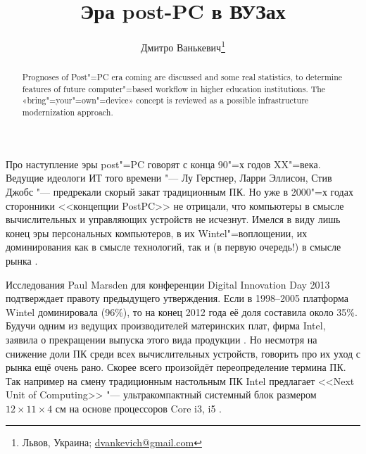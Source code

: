 \documentclass[10pt, a5paper]{article}
\begin{document}
\title{Эра post-PC в ВУЗах}%

\author{Дмитро Ванькевич\footnote{Львов, Украина; \url{dvankevich@gmail.com}}}
\maketitle

\begin{abstract}
Prognoses of Post"=PC era coming are discussed and some real statistics, to determine features of future computer"=based workflow in higher education institutions. The «bring"=your"=own"=device» concept is reviewed as a possible infrastructure modernization approach.
\end{abstract}

Про наступление эры post"=PC говорят с конца 90"=х годов XX"=века. Ведущие идеологи ИТ того времени "--- Лу Герстнер, Ларри Эллисон, Стив Джобс "--- предрекали скорый закат традиционным ПК. Но уже в 2000"=х годах сторонники <<концепции PostPC>> не отрицали, что компьютеры в смысле вычислительных и управляющих устройств не исчезнут. Имелся в виду лишь конец эры персональных компьютеров, в их Wintel"=воплощении\cite{Vank1}, их доминирования как в смысле технологий, так и (в первую очередь!) в смысле рынка \cite{Vank2}.

Исследования Paul Marsden для конференции Digital Innovation Day 2013 подтверждает правоту предыдущего утверждения\cite{Vank3}. Если в 1998--2005 платформа Wintel доминировала (96\%), то на конец 2012 года её доля составила около 35\%. Будучи одним из ведущих производителей материнских плат, фирма Intel, заявила о прекращении выпуска этого вида продукции \cite{Vank4}. Но несмотря на снижение доли ПК среди всех вычислительных устройств, говорить про их уход с рынка ещё очень рано. Скорее всего произойдёт переопределение термина ПК. Так например на смену традиционным настольным ПК Intel предлагает <<Next Unit of Computing>> "--- ультракомпактный системный блок размером $12\times11\times4$ см на основе процессоров Core i3, i5 \cite{Vank5}.
\end{document}
